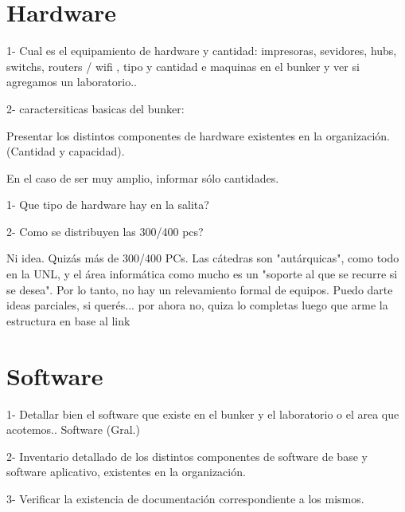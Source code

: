 \documentclass[10pt,a4paper,final]{article}
\begin{document}
\section{Hardware}
1- Cual es el equipamiento de hardware y cantidad: impresoras, sevidores, hubs, switchs, routers / wifi , tipo y cantidad e maquinas en el bunker y ver si agregamos un laboratorio..

2- caractersiticas basicas del bunker:

Presentar los distintos componentes de hardware existentes en la organización. (Cantidad y capacidad).

En el caso de ser muy amplio, informar sólo cantidades.

1- Que tipo de hardware hay en la salita?

2- Como se distribuyen las 300/400 pcs?

\begin{scriptsize}
Ni idea. Quizás más de 300/400 PCs. Las cátedras son "autárquicas", como todo en la UNL, y el área informática como mucho es un "soporte al que se recurre si se desea". Por lo tanto, no hay un relevamiento formal de equipos.
Puedo darte ideas parciales, si querés...
por ahora no, quiza lo completas luego que arme la estructura en base al link
\end{scriptsize}

\section{Software}
1- Detallar bien el software que existe en el bunker y el laboratorio o el area que acotemos..
Software (Gral.)

2- Inventario detallado de los distintos componentes de software de base y software aplicativo, existentes en la organización.

3- Verificar la existencia de documentación correspondiente a los mismos.
\end{document}
